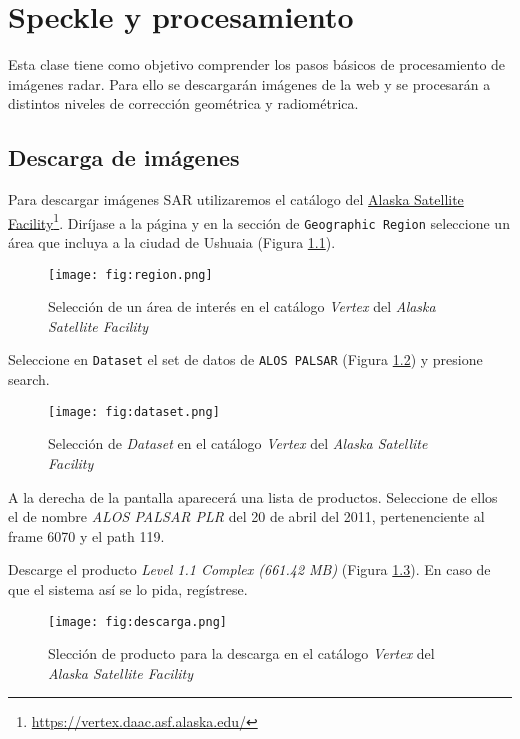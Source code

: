 \chapter{Speckle y procesamiento}

Esta clase tiene como objetivo comprender los pasos básicos de procesamiento de imágenes radar. Para ello se descargarán imágenes de la web y se procesarán a distintos niveles de corrección geométrica y radiométrica.

\section{Descarga de imágenes}

Para descargar imágenes SAR utilizaremos el catálogo del \href{https://vertex.daac.asf.alaska.edu/}{Alaska Satellite Facility}\footnote{\href{https://vertex.daac.asf.alaska.edu/}{https://vertex.daac.asf.alaska.edu/}}. Diríjase a la página y en la sección de \texttt{Geographic Region} seleccione un área que incluya a la ciudad de Ushuaia (Figura \ref{fig:region}).

\begin{figure}[h!]
    \centering
    \texttt{[image: fig:region.png]}
    \caption{Selección de un área de interés en el catálogo \emph{Vertex} del \emph{Alaska Satellite Facility}}
    \label{fig:region}
\end{figure}

Seleccione en \texttt{Dataset} el set de datos de \texttt{ALOS PALSAR} (Figura \ref{fig:dataset}) y presione search.

\begin{figure}[h!]
    \centering
    \texttt{[image: fig:dataset.png]}
    \caption{Selección de \emph{Dataset} en el catálogo \emph{Vertex} del \emph{Alaska Satellite Facility}}
    \label{fig:dataset}
\end{figure}

A la derecha de la pantalla aparecerá una lista de productos. Seleccione de ellos el de nombre \emph{ALOS PALSAR PLR} del 20 de abril del 2011, pertenenciente al frame 6070 y el path 119.

Descarge el producto \emph{Level 1.1 Complex (661.42 MB)} (Figura \ref{fig:descarga}). En caso de que el sistema así se lo pida, regístrese.

\begin{figure}[h!]
    \centering
    \texttt{[image: fig:descarga.png]}
    \caption{Slección de producto para la descarga en el catálogo \emph{Vertex} del \emph{Alaska Satellite Facility}}
    \label{fig:descarga}
\end{figure}

